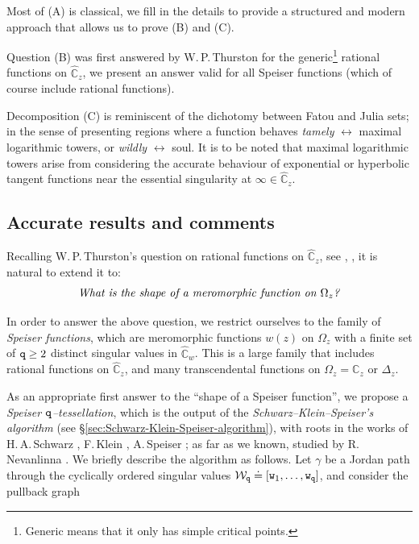 \documentclass[final,3p,times]{elsarticle}
\newcommand{\CC}{\ensuremath{{\mathbb C}}}
\newcommand{\CW}{\ensuremath{{\widehat{\mathbb C}}}}
\theoremstyle{definition}
\begin{document}
Most of (A) is classical, we fill in the details to provide a structured and modern 
approach that allows us to prove (B) and (C).

Question (B) was first answered by W.\,P.\,Thurston for the 
generic\footnote
{Generic means that it only has simple critical points.} 
rational functions on $\CW_z$, we present an answer 
valid for all 
Speiser functions (which of course include rational functions).

Decomposition (C) is reminiscent of the dichotomy between 
Fatou and Julia sets; 
in the sense of presenting regions where a 
function behaves 
\emph{tamely} $\longleftrightarrow$ maximal logarithmic towers, or
\emph{wildly} $\longleftrightarrow$ soul.
It is to be noted that maximal logarithmic towers arise from 
considering the accurate behaviour of exponential or hyperbolic 
tangent functions near the
essential singularity at $\infty\in \CW_z$.

\subsection{Accurate results and comments}
Recalling W.\,P.\,Thurston's question on rational functions
on $\CW_z$, see 
\cite{Thurston2}, 
\cite{Koch-Lei}, it is natural to extend it to:
%
\begin{equation*}
\text{\emph{What is the shape of a meromorphic function
on $\Omega_z$?}}
\end{equation*}

\noindent
In order to answer the above question, we restrict ourselves to the family of 
\emph{Speiser functions}, which are meromorphic functions $w(z)$ on 
$\Omega_z$ with a finite set of
${\tt q} \geq 2$ distinct singular values in $\CW_w$. 
This is a large family 
that includes rational functions on $\CW_z$, and
many transcendental functions on $\Omega_z= \CC_z$ or $\Delta_z$.

As an appropriate first answer to the ``shape of a Speiser function'', 
we propose a 
\emph{Speiser $\tt q$--tessellation}, 
which is the output of the 
\emph{Schwarz--Klein--Speiser's algorithm} 
(see \S\ref{sec:Schwarz-Klein-Speiser-algorithm}),
with roots in the works of 
H.\,A.\,Schwarz \cite{Schwarz}, 
F.\,Klein \cite{Klein}, 
A.\,Speiser \cite{Speiser}; 
as far as we known, studied by
R.\,Nevanlinna \cite{Nevanlinna2}.
We briefly describe the algorithm as follows.
Let $\gamma$ be a Jordan path through the cyclically ordered 
singular values
$\mathcal{W}_{\tt q} \doteq [{\tt w}_1, \ldots , {\tt w}_{\tt q}]$, and consider the pullback graph 
\end{document}
